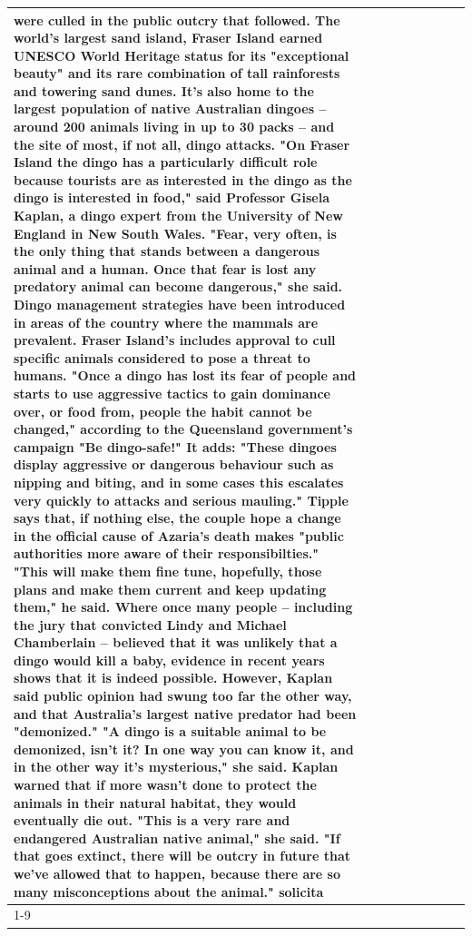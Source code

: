 \begin{table}[H]
\begin{tabular}{lllrlllll}
were culled in the public outcry that followed. The world's largest sand island, Fraser Island earned UNESCO World Heritage status for its "exceptional beauty" and its rare combination of tall rainforests and towering sand dunes. It's also home to the largest population of native Australian dingoes -- around 200 animals living in up to 30 packs -- and the site of most, if not all, dingo attacks. "On Fraser Island the dingo has a particularly difficult role because tourists are as interested in the dingo as the dingo is interested in food," said Professor Gisela Kaplan, a dingo expert from the University of New England in New South Wales. "Fear, very often, is the only thing that stands between a dangerous animal and a human. Once that fear is lost any predatory animal can become dangerous," she said. Dingo management strategies have been introduced in areas of the country where the mammals are prevalent. Fraser Island's includes approval to cull specific animals considered to pose a threat to humans. "Once a dingo has lost its fear of people and starts to use aggressive tactics to gain dominance over, or food from, people the habit cannot be changed," according to the Queensland government's campaign "Be dingo-safe!" It adds: "These dingoes display aggressive or dangerous behaviour such as nipping and biting, and in some cases this escalates very quickly to attacks and serious mauling." Tipple says that, if nothing else, the couple hope a change in the official cause of Azaria's death makes "public authorities more aware of their responsibilties." "This will make them fine tune, hopefully, those plans and make them current and keep updating them," he said. Where once many people -- including the jury that convicted Lindy and Michael Chamberlain -- believed that it was unlikely that a dingo would kill a baby, evidence in recent years shows that it is indeed possible. However, Kaplan said public opinion had swung too far the other way, and that Australia's largest native predator had been "demonized." "A dingo is a suitable animal to be demonized, isn't it? In one way you can know it, and in the other way it's mysterious," she said. Kaplan warned that if more wasn't done to protect the animals in their natural habitat, they would eventually die out. "This is a very rare and endangered Australian native animal," she said. "If that goes extinct, there will be outcry in future that we've allowed that to happen, because there are so many misconceptions about the animal." solicita \\
\cline{1-9}

\end{tabular}
\end{table}
